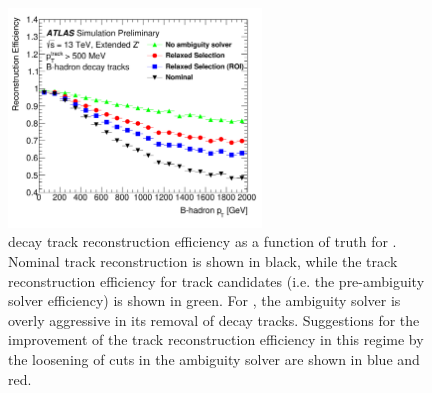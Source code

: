 \begin{figure}[!htbp]
  \centering
  \includegraphics[width=0.6\textwidth]{chapters/3.tracking/figs/b_track_reco_eff.png}
  \caption{
    \bhadron decay track reconstruction efficiency as a function of truth \bhadron \pt for \Zprimejets \cite{2022DonalTrackReco}.
    Nominal track reconstruction is shown in black, while the track reconstruction efficiency for track candidates (i.e. the pre-ambiguity solver efficiency) is shown in green.
    For \highpt \bhadrons, the ambiguity solver is overly aggressive in its removal of \bhadron decay tracks.
    Suggestions for the improvement of the track reconstruction efficiency in this regime by the loosening of cuts in the ambiguity solver are shown in blue and red.
  }
  \label{fig:b_track_eff}
\end{figure}


